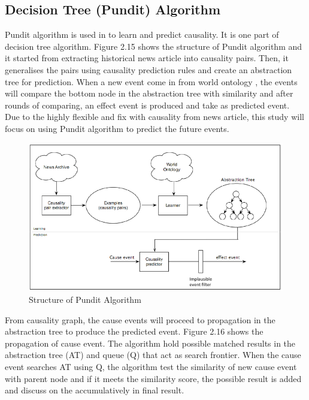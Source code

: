 \documentclass[twoside]{utmthesis}
\begin{document}
\subsection{Decision Tree (Pundit) Algorithm}
Pundit algorithm is used in \cite{radinsky2014pundit} to learn and predict causality. It is one part of decision tree algorithm. Figure 2.15 shows the structure of Pundit algorithm and it started from extracting historical news article into causality pairs. Then, it generalises the pairs using causality prediction rules and create an abstraction tree for prediction. When a new event come in from world ontology , the events will compare the bottom node in the abstraction tree with similarity and after rounds of comparing, an effect event is produced and take as predicted event. Due to the highly flexible and fix with causality from news article, this study will focus on using Pundit algorithm to predict the future events. 

\begin{figure}[h]
\centering
\includegraphics[width=1\textwidth]{./diagram/pundit}
\caption{Structure of Pundit Algorithm \citep{radinsky2014pundit}}
\end{figure} 
\vspace{-1cm}
From causality graph, the cause events will proceed to propagation in the abstraction tree to produce the predicted event. Figure 2.16 shows the propagation of cause event. The algorithm hold possible matched results in the abstraction tree (AT) and queue (Q) that act as search frontier. When the cause event searches AT using Q, the algorithm test the similarity of new cause event with parent node and if it meets the similarity score, the possible result is added and discuss on the accumulatively in final result.  
\end{document}
